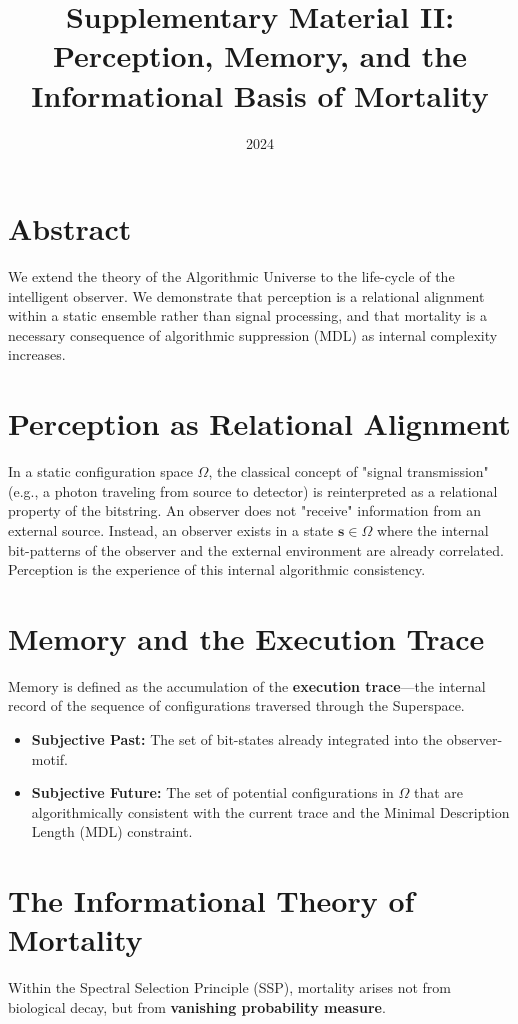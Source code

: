 \documentclass[11pt]{article}
\title{Supplementary Material II: Perception, Memory, and the Informational Basis of Mortality}
\date{2024}
\begin{document}
\maketitle

\section*{Abstract}
We extend the theory of the Algorithmic Universe to the life-cycle of the intelligent observer. We demonstrate that perception is a relational alignment within a static ensemble rather than signal processing, and that mortality is a necessary consequence of algorithmic suppression (MDL) as internal complexity increases.

\section{Perception as Relational Alignment}
In a static configuration space $\Omega$, the classical concept of "signal transmission" (e.g., a photon traveling from source to detector) is reinterpreted as a relational property of the bitstring.
An observer does not "receive" information from an external source. Instead, an observer exists in a state $\mathbf{s} \in \Omega$ where the internal bit-patterns of the observer and the external environment are already correlated. Perception is the experience of this internal algorithmic consistency. 

\section{Memory and the Execution Trace}
Memory is defined as the accumulation of the \textbf{execution trace}—the internal record of the sequence of configurations traversed through the Superspace. 
\begin{itemize}
    \item \textbf{Subjective Past:} The set of bit-states already integrated into the observer-motif.
    \item \textbf{Subjective Future:} The set of potential configurations in $\Omega$ that are algorithmically consistent with the current trace and the Minimal Description Length (MDL) constraint.
\end{itemize}

\section{The Informational Theory of Mortality}
Within the Spectral Selection Principle (SSP), mortality arises not from biological decay, but from \textbf{vanishing probability measure}. 
\end{document}
